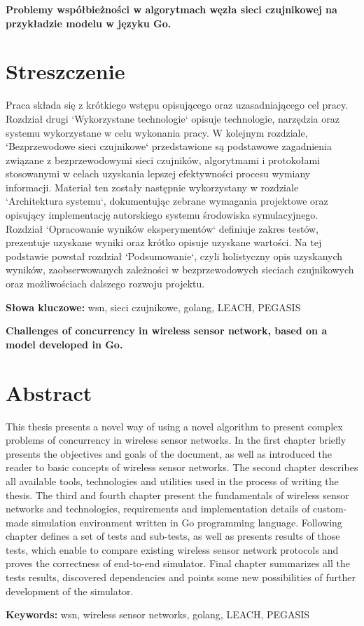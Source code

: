 \newpage
\begin{center}
\large \bf
Problemy współbieżności w algorytmach węzła sieci czujnikowej na przykładzie modelu w języku Go.
\end{center}

\section*{Streszczenie}
Praca składa się z krótkiego wstępu opisującego oraz uzasadniającego cel pracy.
Rozdział drugi `Wykorzystane technologie` opisuje technologie, narzędzia oraz systemu wykorzystane w celu wykonania pracy.
W kolejnym rozdziale, `Bezprzewodowe sieci czujnikowe` przedstawione są podstawowe zagadnienia związane z bezprzewodowymi sieci czujników, algorytmami i protokołami stosowanymi w celach uzyskania lepszej efektywności procesu wymiany informacji.
Materiał ten zostały następnie wykorzystany w rozdziale `Architektura systemu`, dokumentując zebrane wymagania projektowe oraz opisujący implementację autorskiego systemu środowiska symulacyjnego.
Rozdział `Opracowanie wyników eksperymentów` definiuje zakres testów, prezentuje uzyskane wyniki oraz krótko opisuje uzyskane wartości.
Na tej podstawie powstał rozdział `Podsumowanie`, czyli holistyczny opis uzyskanych wyników, zaobserwowanych zależności w bezprzewodowych sieciach czujnikowych oraz możliwościach dalszego rozwoju projektu. 

\bigskip
{\noindent\bf Słowa kluczowe:} wsn, sieci czujnikowe, golang, LEACH, PEGASIS

\vskip 2cm

\newpage
\begin{center}
\large \bf
Challenges of concurrency in wireless sensor network, based on a model developed in Go.
\end{center}

\section*{Abstract}
This thesis presents a novel way of using a novel algorithm to present complex problems of concurrency in wireless sensor networks. 
In the first chapter briefly presents the objectives and goals of the document, as well as introduced the reader to basic concepts of wireless sensor networks.
The second chapter describes all available tools, technologies and utilities used in the process of writing the thesis.
The third and fourth chapter present the fundamentals of wireless sensor networks and technologies, requirements and implementation details of custom-made simulation environment written in Go programming language.
Following chapter defines a set of tests and sub-tests, as well as presents results of those tests, which enable to compare existing wireless sensor network protocols
and proves the correctness of end-to-end simulator.
Final chapter summarizes all the tests results, discovered dependencies and points some new possibilities of further development of the simulator.

\bigskip
{\noindent\bf Keywords:} wsn, wireless sensor networks, golang, LEACH, PEGASIS

\vfill
